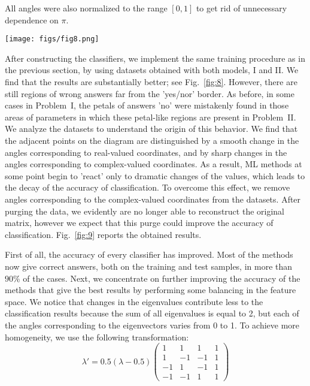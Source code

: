 \documentclass[%
 aip,
 floatfix,
 amsmath,amssymb,
 reprint,%
]{revtex4-1}
\begin{document}
All angles were also normalized to the range $[0, 1]$ to get rid of unnecessary dependence on $\pi$.  

\begin{figure*}[h]
  \texttt{[image: figs/fig8.png]}
  \caption{'Yes/no' partition of 
  the parameter space for Problems I (top row) and II (bottom row) for different values of phase shift. Partitions are obtained by using the test, Eq.~(13) [left] and ML methods, the Nearest neighbors method [center] and the Random forest method [right]. For the ML methods the parametrization based on the eigenvalues and eigenvectors of Choi matrices is used.} \label{fig:8}
\end{figure*}

After constructing the classifiers, we implement the same training procedure as in the previous section, by using datasets obtained with both models, I and II. We find that the results are substantially better; see Fig.~\ref{fig:8}. However, there are still regions of wrong answers far from the 'yes/nor' border. As before, in some cases in Problem~I, the petals of answers 'no' were mistakenly found in those areas of parameters in which these petal-like regions are present in Problem~II. We analyze the datasets to  understand the origin of this behavior. We find that the adjacent points on the diagram are distinguished by a smooth change in the angles corresponding to real-valued coordinates, and by sharp changes in the angles corresponding to complex-valued coordinates. As a result, ML methods at some point begin to 'react' only to dramatic changes of the values, which leads to the decay of the accuracy of classification. To overcome this effect, we remove angles corresponding to the complex-valued coordinates from the datasets. After purging the data, we evidently are no longer able to reconstruct the original matrix, however we 
expect that this purge could improve the accuracy of classification. Fig.~\ref{fig:9} reports  the obtained results. 

First of all, the accuracy of every classifier has improved. Most of the methods now give correct answers, both on the training and test samples, in more than $90\%$ of the cases. Next, we concentrate on further improving the accuracy of the methods that give the best results by performing some balancing in the feature space. We notice that changes in the  eigenvalues contribute less to the classification results because the sum of all eigenvalues is equal to 2, but each of the angles corresponding to the eigenvectors varies from 0 to 1. To achieve more homogeneity, we use the following transformation:
\begin{equation}\label{fano}
    \lambda'=0.5 (\lambda -0.5) 
    \begin{pmatrix}
1 & 1 & 1 & 1\\
1 & -1 & -1 & 1\\
-1 & 1 & -1 & 1\\
-1 & -1 & 1 & 1
\end{pmatrix}
\end{equation}
\end{document}
